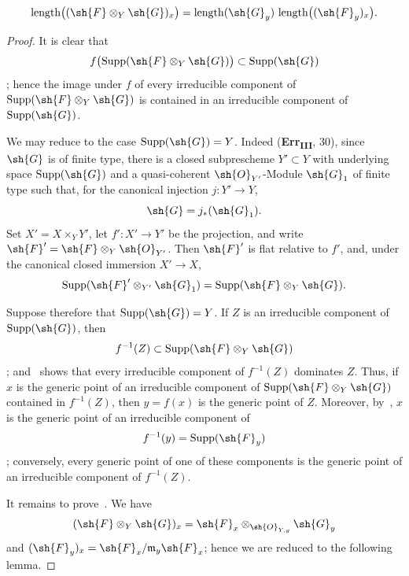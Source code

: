 \begin{env}[2.5.5.1]
\label{IV.2.5.5.1}
\[
  \operatorname{length}\bigl((\sh{F}\otimes_Y\sh{G})_x\bigr)
  =
  \operatorname{length}(\sh{G}_y)\,
  \operatorname{length}\bigl((\sh{F}_y)_x\bigr).
\]
\end{env}

\begin{proof}
It is clear that
\[
  f\bigl(\operatorname{Supp}(\sh{F}\otimes_Y\sh{G})\bigr)
  \subset \operatorname{Supp}(\sh{G})
\]
; hence the image under $f$ of every irreducible
component of $\operatorname{Supp}(\sh{F}\otimes_Y\sh{G})$ is contained
in an irreducible component of $\operatorname{Supp}(\sh{G})$.

We may reduce to the case $\operatorname{Supp}(\sh{G})=Y$. Indeed
\textnormal{(}\textbf{Err}\textsubscript{\textbf{III}}, 30\textnormal{)},
since $\sh{G}$ is of finite type, there is a closed subprescheme
$Y'\subset Y$ with underlying space $\operatorname{Supp}(\sh{G})$ and a
quasi-coherent $\sh{O}_{Y'}$-Module $\sh{G}_1$ of finite type such that,
for the canonical injection $j:Y'\to Y$,
\[
  \sh{G}=j_*(\sh{G}_1).
\]
Set $X'=X\times_Y Y'$, let $f':X'\to Y'$ be the projection, and write
$\sh{F}'=\sh{F}\otimes_Y\sh{O}_{Y'}$. Then $\sh{F}'$ is flat relative
to $f'$, and, under the canonical closed immersion $X'\to X$,
\[
  \operatorname{Supp}(\sh{F}'\otimes_{Y'}\sh{G}_1)
  =
  \operatorname{Supp}(\sh{F}\otimes_Y\sh{G}).
\]

Suppose therefore that $\operatorname{Supp}(\sh{G})=Y$. If $Z$ is an
irreducible component of $\operatorname{Supp}(\sh{G})$, then
\[
  f^{-1}(Z)\subset
  \operatorname{Supp}(\sh{F}\otimes_Y\sh{G})
\]
; and~ shows that every irreducible
component of $f^{-1}(Z)$ dominates $Z$. Thus, if $x$ is the generic
point of an irreducible component of
$\operatorname{Supp}(\sh{F}\otimes_Y\sh{G})$ contained in $f^{-1}(Z)$,
then $y=f(x)$ is the generic point of $Z$. Moreover,
by~, $x$ is the generic point of an irreducible
component of
\[
  f^{-1}(y)=\operatorname{Supp}(\sh{F}_y)
\]
; conversely, every generic point of one of these
components is the generic point of an irreducible component of
$f^{-1}(Z)$.


It remains to prove~. We have
\[
  (\sh{F}\otimes_Y\sh{G})_x
  =
  \sh{F}_x\otimes_{\sh{O}_{Y,y}}\sh{G}_y
\]
 and
$(\sh{F}_y)_x=\sh{F}_x/\mathfrak{m}_y\sh{F}_x$; hence we are reduced to
the following lemma.
\end{proof}

